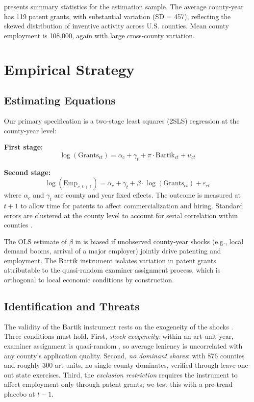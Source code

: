 \documentclass[12pt]{article}
\begin{document}
 presents summary statistics for the estimation sample. The average county-year has 119 patent grants, with substantial variation (SD = 457), reflecting the skewed distribution of inventive activity across U.S. counties. Mean county employment is 108,000, again with large cross-county variation.




\section{Empirical Strategy}
\label{sec:strategy}

\subsection{Estimating Equations}

Our primary specification is a two-stage least squares (2SLS) regression at the county-year level:

\textbf{First stage:}
\begin{equation}
\log(\text{Grants}_{ct}) = \alpha_c + \gamma_t + \pi \cdot \text{Bartik}_{ct} + u_{ct}
\label{eq:first}
\end{equation}

\textbf{Second stage:}
\begin{equation}
\log(\text{Emp}_{c,t+1}) = \alpha_c + \gamma_t + \beta \cdot \log(\text{Grants}_{ct}) + \varepsilon_{ct}
\label{eq:second}
\end{equation}
where $\alpha_c$ and $\gamma_t$ are county and year fixed effects. The outcome is measured at $t+1$ to allow time for patents to affect commercialization and hiring. Standard errors are clustered at the county level to account for serial correlation within counties \citep{bertrand2004much}.

The OLS estimate of $\beta$ in  is biased if unobserved county-year shocks (e.g., local demand booms, arrival of a major employer) jointly drive patenting and employment. The Bartik instrument isolates variation in patent grants attributable to the quasi-random examiner assignment process, which is orthogonal to local economic conditions by construction.

\subsection{Identification and Threats}

The validity of the Bartik instrument rests on the exogeneity of the shocks \citep{borusyak2022shift}. Three conditions must hold. First, \textit{shock exogeneity}: within an art-unit-year, examiner assignment is quasi-random \citep{lemley2012examiner}, so average leniency is uncorrelated with any county's application quality. Second, \textit{no dominant shares}: with 876 counties and roughly 300 art units, no single county dominates, verified through leave-one-out state exercises. Third, the \textit{exclusion restriction} requires the instrument to affect employment only through patent grants; we test this with a pre-trend placebo at $t-1$.
\end{document}
